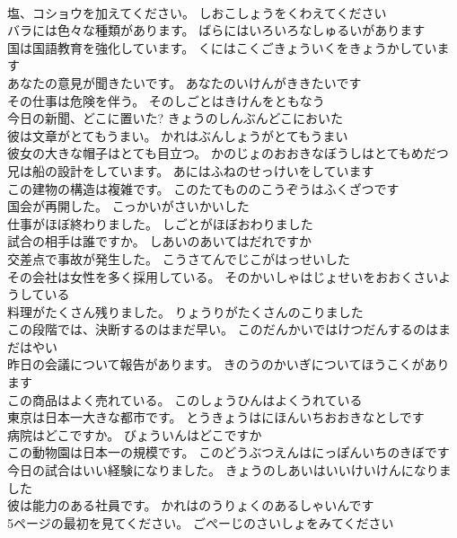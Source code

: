 \documentclass[8pt]{extreport}
\begin{document}
\begin{CJK}{UTF8}{min}
\\	塩、コショウを加えてください。	しおこしょうをくわえてください 
\\	バラには色々な種類があります。	ばらにはいろいろなしゅるいがあります 
\\	国は国語教育を強化しています。	くにはこくごきょういくをきょうかしています 
\\	あなたの意見が聞きたいです。	あなたのいけんがききたいです 
\\	その仕事は危険を伴う。	そのしごとはきけんをともなう 
\\	今日の新聞、どこに置いた?	きょうのしんぶんどこにおいた 
\\	彼は文章がとてもうまい。	かれはぶんしょうがとてもうまい 
\\	彼女の大きな帽子はとても目立つ。	かのじょのおおきなぼうしはとてもめだつ 
\\	兄は船の設計をしています。	あにはふねのせっけいをしています 
\\	この建物の構造は複雑です。	このたてもののこうぞうはふくざつです 
\\	国会が再開した。	こっかいがさいかいした 
\\	仕事がほぼ終わりました。	しごとがほぼおわりました 
\\	試合の相手は誰ですか。	しあいのあいてはだれですか 
\\	交差点で事故が発生した。	こうさてんでじこがはっせいした 
\\	その会社は女性を多く採用している。	そのかいしゃはじょせいをおおくさいようしている 
\\	料理がたくさん残りました。	りょうりがたくさんのこりました 
\\	この段階では、決断するのはまだ早い。	このだんかいではけつだんするのはまだはやい 
\\	昨日の会議について報告があります。	きのうのかいぎについてほうこくがあります 
\\	この商品はよく売れている。	このしょうひんはよくうれている 
\\	東京は日本一大きな都市です。	とうきょうはにほんいちおおきなとしです 
\\	病院はどこですか。	びょういんはどこですか 
\\	この動物園は日本一の規模です。	このどうぶつえんはにっぽんいちのきぼです 
\\	今日の試合はいい経験になりました。	きょうのしあいはいいけいけんになりました 
\\	彼は能力のある社員です。	かれはのうりょくのあるしゃいんです 
\\	5ページの最初を見てください。	ごぺーじのさいしょをみてください 

\end{CJK}
\end{document}
